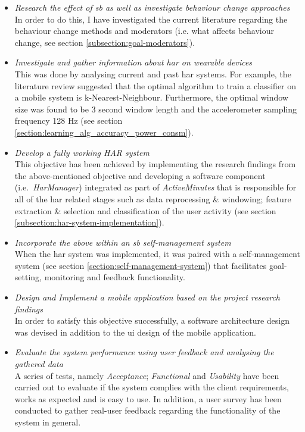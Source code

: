\begin{itemize}
    \item \textit{Research the effect of \gls{sb} as well as investigate behaviour change approaches}\\
    In order to do this, I have investigated the current literature regarding the behaviour change methods and moderators (i.e. what affects behaviour change, see section \ref{subsection:goal-moderators}).
    \item \textit{Investigate and gather information about \gls{har} on wearable devices}\\
    This was done by analysing current and past \gls{har} systems. For example, the literature review suggested that the optimal algorithm to train a classifier on a mobile system is k-Nearest-Neighbour. Furthermore, the optimal window size was found to be 3 second window length and the accelerometer sampling frequency 128 Hz (see section \ref{section:learning_alg_accuracy_power_consm}).
    \item \textit{Develop a fully working HAR system}\\
    This objective has been achieved by implementing the research findings from the above-mentioned objective and developing a software component (i.e.\ \textit{HarManager}) integrated as part of \textit{ActiveMinutes} that is responsible for all of the \gls{har} related stages such as data reprocessing \& windowing; feature extraction \& selection and classification of the user activity (see section \ref{subsection:har-system-implementation}).
    
    \item \textit{Incorporate the above within an \gls{sb} self-management system}\\
    When the \gls{har} system was implemented, it was paired with a self-management system (see section \ref{section:self-management-system}) that facilitates goal-setting, monitoring and feedback functionality.
    \item \textit{Design and Implement a mobile application based on the project research findings}\\
    In order to satisfy this objective successfully, a software architecture design was devised in addition to the \gls{ui} design of the mobile application.
    
    \item \textit{Evaluate the system performance using user feedback and analysing the gathered data}\\
    A series of tests, namely \textit{Acceptance}; \textit{Functional} and \textit{Usability} have been carried out to evaluate if the system complies with the client requirements, works as expected and is easy to use. In addition, a user survey has been conducted to gather real-user feedback regarding the functionality of the system in general.
    

\end{itemize}
